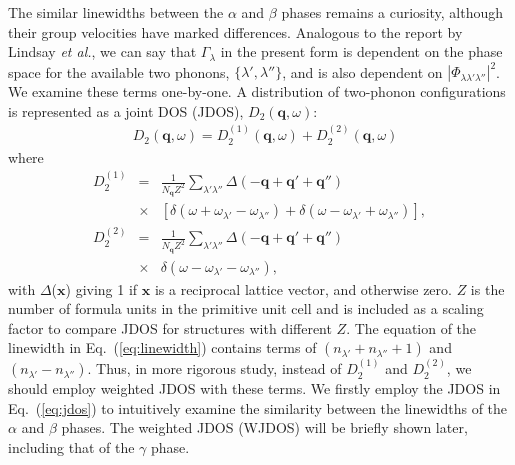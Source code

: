 \documentclass[twocolumn,amsmath,amssymb,a4paper,prb,superscriptaddress,floatfix]{revtex4-1}
\begin{document}
The similar linewidths between the $\alpha$ and
$\beta$ phases remains a curiosity, although their group velocities have marked differences.
Analogous to the report by Lindsay {\it et al.}\cite{Lindsay}, we can say that
$\Gamma_\lambda$ in the present form is dependent on the phase space for the
available two phonons, $\{\lambda', \lambda''\}$, and is also dependent on
$|\Phi_{\lambda\lambda'\lambda''}|^2$. We examine these terms one-by-one. A
distribution of two-phonon configurations is represented as a joint DOS (JDOS),
${D_2(\mathbf{q},\omega)}$:  
\begin{align}
 \label{eq:jdos}
 &D_2(\mathbf{q},\omega) = D_2^{(1)}(\mathbf{q},\omega) +  D_2^{(2)}(\mathbf{q},\omega)
\end{align}
where 
\begin{eqnarray*}
	D_2^{(1)} & = & \frac{1}{N_\mathbf{q}Z^2} \sum_{\lambda'\lambda''}\Delta(-\mathbf{q} + \mathbf{q'} + \mathbf{q''}) \nonumber \\
								   & \times & [\delta(\omega + \omega_{\lambda'} - \omega_{\lambda''}) + \delta(\omega - \omega_{\lambda'} + \omega_{\lambda''})],\\
	D_2^{(2)} & = & \frac{1}{N_\mathbf{q}Z^2} \sum_{\lambda'\lambda''}\Delta(-\mathbf{q} + \mathbf{q'} + \mathbf{q''}) \nonumber \\
								   & \times & \delta(\omega - \omega_{\lambda'} - \omega_{\lambda''}),
\end{eqnarray*}
with $\Delta$($\mathbf{x}$) giving 1 if $\mathbf{x}$ is a reciprocal lattice
vector, and otherwise zero. $Z$ is the number of formula units in the primitive unit cell
and is included as a scaling factor to compare JDOS for structures with different
$Z$. The equation of the linewidth in Eq.~(\ref{eq:linewidth}) contains terms
of $(n_{\lambda'}+n_{\lambda''}+1)$ and $(n_{\lambda'}-n_{\lambda''})$. Thus, in
more rigorous study, instead of $D_2^{(1)}$ and $D_2^{(2)}$, we should
employ weighted JDOS with these terms. We firstly employ the JDOS in
Eq.~(\ref{eq:jdos}) to intuitively examine the similarity between the
linewidths of the $\alpha$ and $\beta$ phases. The weighted JDOS (WJDOS)
will be briefly shown later, including that of the $\gamma$ phase. 
\end{document}
